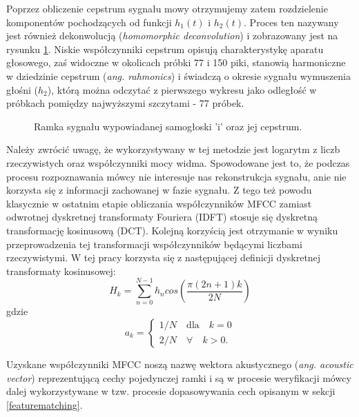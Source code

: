 Poprzez obliczenie cepstrum sygnału mowy otrzymujemy zatem rozdzielenie komponentów pochodzących od funkcji $h_1(t)$ i $h_2(t)$. Proces ten nazywany jest również dekonwolucją (\textit{homomorphic deconvolution})\cite{hdsp} i  zobrazowany jest na rysunku \ref{fig:e_cepstrum}. Niskie współczynniki cepstrum opisują charakterystykę aparatu głosowego, zaś widoczne w okolicach próbki 77 i 150 piki, stanowią harmoniczne w dziedzinie cepstrum (\textit{ang. rahmonics}) i świadczą o okresie sygnału wymuszenia głośni ($h_2$), którą można odczytać z pierwszego wykresu jako odległość w próbkach pomiędzy najwyższymi szczytami - 77 próbek.

\begin{figure}
  \centering
  \begin{minipage}{.5\textwidth}
    \centering
    
  \end{minipage}%
  \begin{minipage}{.5\textwidth}
    \centering
    
  \end{minipage}
  \caption{Ramka sygnału wypowiadanej samogłoski 'i' oraz jej cepstrum.}
  \label{fig:e_cepstrum}
\end{figure}

Należy zwrócić uwagę, że wykorzystywany w tej metodzie jest logarytm z liczb rzeczywistych oraz współczynniki mocy widma. Spowodowane jest to, że podczas procesu rozpoznawania mówcy nie interesuje nas rekonstrukcja sygnału, anie nie korzysta się z informacji zachowanej w fazie sygnału. Z tego też powodu klasycznie w ostatnim etapie obliczania współczynników MFCC zamiast odwrotnej dyskretnej transformaty Fouriera (IDFT) stosuje się dyskretną transformację kosinusową (DCT). Kolejną korzyścią jest otrzymanie w wyniku przeprowadzenia tej transformacji współczynników będącymi liczbami rzeczywistymi. W tej pracy korzysta się z następującej definicji dyskretnej transformaty kosinusowej:
\begin{equation}
    H_k = \sum_{n=0}^{N-1} h_ncos\left(\frac{\pi (2n+1)k}{2N}\right)
\end{equation}
gdzie
\begin{equation}
    a_k = 
    \begin{cases}
        1/N \quad \text{dla}\quad k=0 \\
        2/N \quad \forall \quad k>0.
    \end{cases}
\end{equation}

Uzyskane współczynniki MFCC noszą nazwę wektora akustycznego (\textit{ang. acoustic vector}) reprezentującą cechy pojedynczej ramki i są w procesie weryfikacji mówcy dalej wykorzystywane w tzw. procesie dopasowywania cech opisanym w sekcji \ref{featurematching}.

